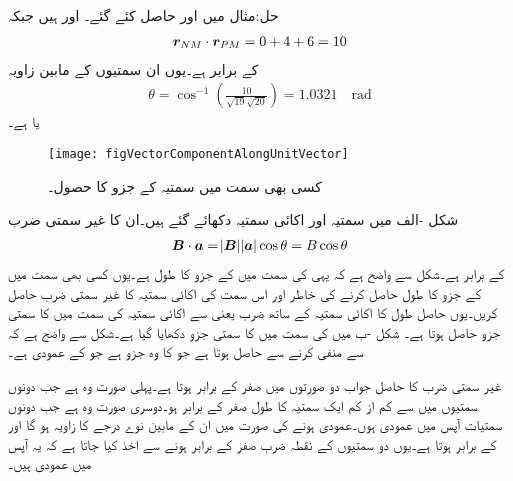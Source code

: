 حل:مثال   میں   اور  حاصل کئے گئے۔  اور  ہیں جبکہ
\begin{align*}
{\ensuremath{{\boldsymbol{r}}}}_{NM} \cdot {\ensuremath{{\boldsymbol{r}}}}_{PM}=0+4+6=10
\end{align*}
کے برابر ہے۔یوں ان سمتیوں کے مابین زاویہ
\begin{align*}
\theta=\cos^{-1} \left(\frac{10}{\sqrt{19} \sqrt{20}} \right)=1.0321 \quad \si{\radian}
\end{align*}
یا  ہے۔
\begin{figure}
\centering
\texttt{[image: figVectorComponentAlongUnitVector]}
\caption{کسی بھی سمت میں سمتیہ کے جزو کا حصول۔}
\label{شکل_سمتیہ_کسی_سمت_میں_جزو}
\end{figure}
شکل -الف میں سمتیہ  اور اکائی سمتیہ   دکھائے گئے ہیں۔ان کا غیر سمتی ضرب
\begin{align*}
{\ensuremath{{\boldsymbol{B}}}} \cdot {\ensuremath{{\boldsymbol{a}}}} = \abs{{{\boldsymbol{B}}}} \abs{{{\boldsymbol{a}}}} \cos \theta=B \cos \theta
\end{align*}
کے برابر ہے۔شکل سے واضح ہے کہ یہی  کی سمت میں  کے جزو کا طول  ہے۔یوں کسی بھی سمت میں  کے جزو کا طول حاصل کرنے کی خاطر  اور اس سمت کی اکائی سمتیہ کا غیر سمتی ضرب حاصل کریں۔یوں حاصل طول کا اکائی سمتیہ کے ساتھ ضرب یعنی  سے اکائی سمتیہ کی سمت میں  کا سمتی جزو  حاصل ہوتا ہے۔ شکل -ب میں  کی سمت میں  کا سمتی جزو  دکھایا گیا ہے۔شکل سے واضح ہے کہ  سے  منفی کرنے سے   حاصل ہوتا ہے جو  کا وہ جزو ہے جو  کے عمودی ہے۔

غیر سمتی ضرب کا حاصل جواب دو صورتوں میں صفر کے برابر ہوتا ہے۔پہلی صورت وہ ہے جب دونوں سمتیوں میں سے کم از کم ایک سمتیہ کا طول صفر کے برابر ہو۔دوسری صورت وہ ہے جب دونوں سمتیات آپس میں عمودی ہوں۔عمودی ہونے کی صورت میں ان کے مابین نوے درجے کا زاویہ ہو گا اور  کے برابر ہوتا ہے۔یوں دو سمتیوں کے نقطہ ضرب صفر کے برابر ہونے  سے اخذ کیا جاتا ہے کہ یہ آپس میں عمودی ہیں۔ 

